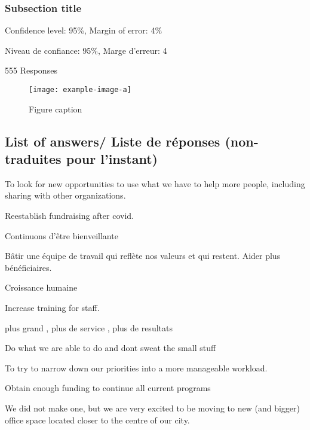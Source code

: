 \subsubsection{Subsection title}

\lipsum[1-2]



\hfill Confidence level: 95\%, Margin of error: 4\%

\hfill
Niveau de confiance: 95\%, Marge d'erreur: 4%
\bigskip

\hfill 555 Responses

\begin{figure}[htb]\centering
  \texttt{[image: example-image-a]}
\caption{Figure caption}
\label{f1}
\end{figure}

\subsection{List of answers/ Liste de réponses (non-traduites pour l'instant)}

To look for new opportunities to use what we have to help more people, including sharing with other organizations.

Reestablish fundraising after covid.

Continuons d'être bienveillante

Bâtir une équipe de travail qui reflète nos valeurs et qui restent. Aider plus bénéficiaires.

Croissance humaine

Increase training for staff.

plus grand , plus de service , plus de resultats

Do what we are able to do and dont sweat the small stuff

To try to narrow down our priorities into a more manageable workload.

Obtain enough funding to continue all current programs

We did not make one, but we are very excited to be moving to new (and bigger) office space located closer to the centre of our
city.

